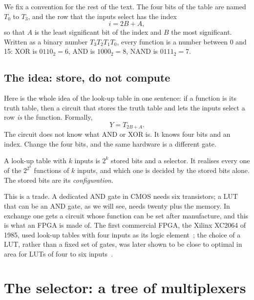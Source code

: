 \documentclass[11pt,a4paper]{article}
\begin{document}
We fix a convention for the rest of the text. The four bits of the table
are named $T_0$ to $T_3$, and the row that the inputs select has the
index
\begin{equation}
    i = 2B + A,
    \label{eq:index}
\end{equation}
so that $A$ is the least significant bit of the index and $B$ the most
significant. Written as a binary number $T_3T_2T_1T_0$, every function
is a number between 0 and 15: XOR is $0110_2=6$, AND is $1000_2=8$, NAND
is $0111_2=7$.

\subsection{The idea: store, do not compute}

Here is the whole idea of the look-up table in one sentence: if a
function is its truth table, then a circuit that stores the truth table
and lets the inputs select a row \emph{is} the function. Formally,
\begin{equation}
    Y = T_{2B+A}.
    \label{eq:lut}
\end{equation}
The circuit does not know what AND or XOR is. It knows four bits and an
index. Change the four bits, and the same hardware is a different gate.

\begin{merke}
A look-up table with $k$ inputs is $2^k$ stored bits and a selector.
It realises every one of the $2^{2^k}$ functions of $k$ inputs, and
which one is decided by the stored bits alone. The stored bits are its
\emph{configuration}.
\end{merke}

This is a trade. A dedicated AND gate in CMOS needs six transistors; a
LUT that can be an AND gate, as we will see, needs twenty plus the
memory. In exchange one gets a circuit whose function can be set after
manufacture, and this is what an FPGA is made of. The first commercial
FPGA, the Xilinx XC2064 of 1985, used look-up tables with four inputs
as its logic element~\cite{Carter1986,Freeman1989}; the choice of a
LUT, rather than a fixed set of gates, was later shown to be close to
optimal in area for LUTs of four to six inputs~\cite{Rose1990,Ahmed2004}.

\section{The selector: a tree of multiplexers}
\label{sec:mux}
\end{document}
